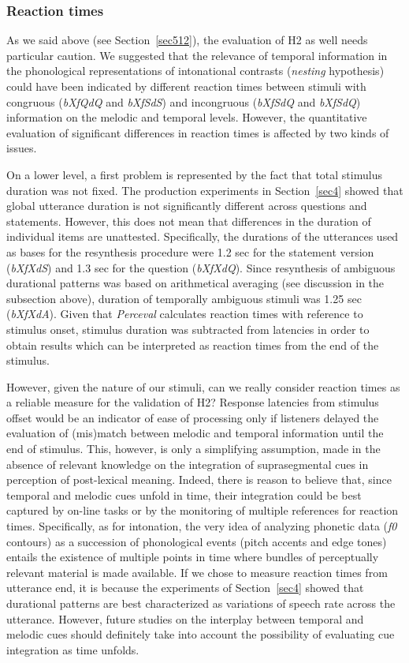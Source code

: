 \subsubsection{Reaction times}\label{sec5412}
As we said above (see Section~\ref{sec512}), the evaluation of H2 as well needs particular caution. We suggested that the relevance of temporal information in the phonological representations of intonational contrasts (\textit{nesting} hypothesis) could have been indicated by different reaction times between stimuli with congruous (\textit{bXfQdQ} and \textit{bXfSdS}) and incongruous (\textit{bXfSdQ} and \textit{bXfSdQ}) information on the melodic and temporal levels. However, the quantitative evaluation of significant differences in reaction times is affected by two kinds of issues.

On a lower level, a first problem is represented by the fact that total stimulus duration was not fixed. The production experiments in Section~\ref{sec4} showed that global utterance duration is not significantly different across questions and statements. However, this does not mean that differences in the duration of individual items are unattested. Specifically, the durations of the utterances used as bases for the resynthesis procedure were 1.2 sec for the statement version (\textit{bXfXdS}) and 1.3 sec for the question (\textit{bXfXdQ}). Since resynthesis of ambiguous durational patterns was based on arithmetical averaging (see discussion in the subsection above), duration of temporally ambiguous stimuli was 1.25 sec (\textit{bXfXdA}). Given that \textit{Perceval} calculates reaction times with reference to stimulus onset, stimulus duration was subtracted from latencies in order to obtain results which can be interpreted as reaction times from the end of the stimulus.

However, given the nature of our stimuli, can we really consider reaction times as a reliable measure for the validation of H2? Response latencies from stimulus offset would be an indicator of ease of processing only if listeners delayed the evaluation of (mis)match between melodic and temporal information until the end of stimulus. This, however, is only a simplifying assumption, made in the absence of relevant knowledge on the integration of suprasegmental cues in perception of post-lexical meaning. Indeed, there is reason to believe that, since temporal and melodic cues unfold in time, their integration could be best captured by on-line tasks or by the monitoring of multiple references for reaction times. Specifically, as for intonation, the very idea of analyzing phonetic data (\textit{f0} contours) as a succession of phonological events (pitch accents and edge tones) entails the existence of multiple points in time where bundles of perceptually relevant material is made available. If we chose to measure reaction times from utterance end, it is because the experiments of Section~\ref{sec4} showed that durational patterns are best characterized as variations of speech rate across the utterance. However, future studies on the interplay between temporal and melodic cues should definitely take into account the possibility of evaluating cue integration as time unfolds.

